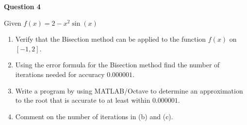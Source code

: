 


\begin{tcolorbox}
\textbf{Question 4} 

Given $f(x)=2-x^{2} \sin (x)$
\begin{enumerate}[label=(\alph*)]
\item Verify that the Bisection method can be applied to the function $f(x)$ on $[-1,2]$.
\item Using the error formula for the Bisection method find the number of iterations needed for accuracy $0.000001$.
\item Write a program by using MATLAB/Octave to determine an approximation to the root that is accurate to at least within $0.000001$.
\item Comment on the number of iterations in (b) and (c).
\end{enumerate}
\end{tcolorbox}

